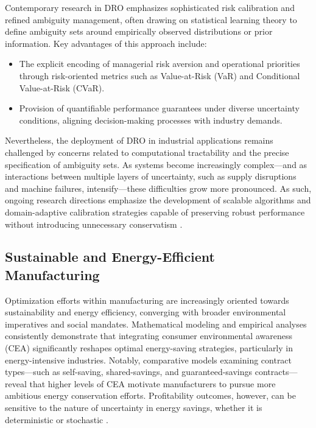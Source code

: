 Contemporary research in DRO emphasizes sophisticated risk calibration and refined ambiguity management, often drawing on statistical learning theory to define ambiguity sets around empirically observed distributions or prior information. Key advantages of this approach include:

\begin{itemize}
    \item The explicit encoding of managerial risk aversion and operational priorities through risk-oriented metrics such as Value-at-Risk (VaR) and Conditional Value-at-Risk (CVaR).
    \item Provision of quantifiable performance guarantees under diverse uncertainty conditions, aligning decision-making processes with industry demands.
\end{itemize}

Nevertheless, the deployment of DRO in industrial applications remains challenged by concerns related to computational tractability and the precise specification of ambiguity sets. As systems become increasingly complex—and as interactions between multiple layers of uncertainty, such as supply disruptions and machine failures, intensify—these difficulties grow more pronounced. As such, ongoing research directions emphasize the development of scalable algorithms and domain-adaptive calibration strategies capable of preserving robust performance without introducing unnecessary conservatism \cite{ref77}.

\subsection{Sustainable and Energy-Efficient Manufacturing}

Optimization efforts within manufacturing are increasingly oriented towards sustainability and energy efficiency, converging with broader environmental imperatives and social mandates. Mathematical modeling and empirical analyses consistently demonstrate that integrating consumer environmental awareness (CEA) significantly reshapes optimal energy-saving strategies, particularly in energy-intensive industries. Notably, comparative models examining contract types—such as self-saving, shared-savings, and guaranteed-savings contracts—reveal that higher levels of CEA motivate manufacturers to pursue more ambitious energy conservation efforts. Profitability outcomes, however, can be sensitive to the nature of uncertainty in energy savings, whether it is deterministic or stochastic \cite{ref80}.

